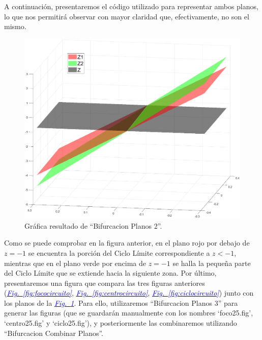 \documentclass[12pt,a4paper]{report} %
\newcommand{\fref}[1]{\hyperref[#1]{\textcolor{blue}{\textit{Fig.~\ref*{#1}}}}}
\begin{document}
	\vspace{0.5cm}A continuación, presentaremos el código utilizado para representar ambos planos, lo que nos permitirá observar con mayor claridad que, efectivamente, no son el mismo.
	
	\vspace{0.5cm}
	
	\newpage
	
	\begin{figure}[h]
		\centering
		\includegraphics[width=1\textwidth]{planoscircuito.eps}
		\caption{Gráfica resultado de ``Bifurcacion Planos 2''.}
		\label{fig:planoscircuito}
	\end{figure}\smallskip
	
	\vspace{0.5cm}\noindent Como se puede comprobar en la figura anterior, en el plano rojo por debajo de $z=-1$ se encuentra la porción del Ciclo Límite correspondiente a $z<-1$, mientras que en el plano verde por encima de $z=-1$ se halla la pequeña parte del Ciclo Límite que se extiende hacia la siguiente zona. Por último, presentaremos una figura que compara las tres figuras anteriores (\fref{fig:fococircuito}, \fref{fig:centrocircuito}, \fref{fig:ciclocircuito}) junto con los planos de la \fref{fig:planoscircuito}. Para ello, utilizaremos ``Bifurcacion Planos 3'' para generar las figuras (que se guardarán manualmente con los nombres `foco25.fig', `centro25.fig' y `ciclo25.fig'), y posteriormente las combinaremos utilizando ``Bifurcacion Combinar Planos''.
	\newpage
	
\end{document}
